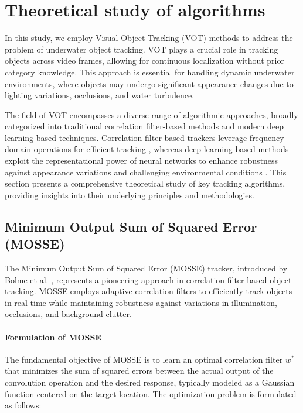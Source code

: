\chapter{Theoretical study of algorithms}
\label{ch:fundamental}

In this study, we employ Visual Object Tracking (VOT) methods to address the problem of underwater object tracking. VOT plays a crucial role in tracking objects across video frames, allowing for continuous localization without prior category knowledge. This approach is essential for handling dynamic underwater environments, where objects may undergo significant appearance changes due to lighting variations, occlusions, and water turbulence.

The field of VOT encompasses a diverse range of algorithmic approaches, broadly categorized into traditional correlation filter-based methods and modern deep learning-based techniques. Correlation filter-based trackers leverage frequency-domain operations for efficient tracking \cite{henriques2012exploiting,danelljan2014accurate}, whereas deep learning-based methods exploit the representational power of neural networks to enhance robustness against appearance variations and challenging environmental conditions \cite{danelljan2016discriminative,felzenszwalb2010object}. This section presents a comprehensive theoretical study of key tracking algorithms, providing insights into their underlying principles and methodologies.



\section{Minimum Output Sum of Squared Error (MOSSE)}
The Minimum Output Sum of Squared Error (MOSSE) tracker, introduced by Bolme et al. \cite{bolme2010visual}, represents a pioneering approach in correlation filter-based object tracking. MOSSE employs adaptive correlation filters to efficiently track objects in real-time while maintaining robustness against variations in illumination, occlusions, and background clutter.

\subsubsection{Formulation of MOSSE}
The fundamental objective of MOSSE is to learn an optimal correlation filter $w^*$ that minimizes the sum of squared errors between the actual output of the convolution operation and the desired response, typically modeled as a Gaussian function centered on the target location. The optimization problem is formulated as follows:

